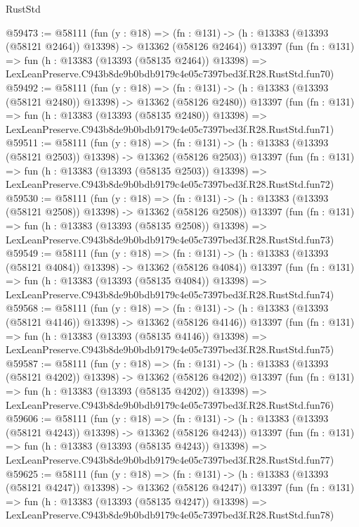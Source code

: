 \begin{lexlean}{RustStd}
\begin{coremodule}
@59473 := @58111
    (fun (y : @18) =>
    (fn : @131) -> (h : @13383 (@13393 (@58121 @2464)) @13398) -> @13362 (@58126 @2464))
    @13397
    (fun (fn : @131) =>
    fun (h : @13383 (@13393 (@58135 @2464)) @13398) =>
    LexLeanPreserve.C943b8de9b0bdb9179c4e05c7397bed3f.R28.RustStd.fun70)
@59492 := @58111
    (fun (y : @18) =>
    (fn : @131) -> (h : @13383 (@13393 (@58121 @2480)) @13398) -> @13362 (@58126 @2480))
    @13397
    (fun (fn : @131) =>
    fun (h : @13383 (@13393 (@58135 @2480)) @13398) =>
    LexLeanPreserve.C943b8de9b0bdb9179c4e05c7397bed3f.R28.RustStd.fun71)
@59511 := @58111
    (fun (y : @18) =>
    (fn : @131) -> (h : @13383 (@13393 (@58121 @2503)) @13398) -> @13362 (@58126 @2503))
    @13397
    (fun (fn : @131) =>
    fun (h : @13383 (@13393 (@58135 @2503)) @13398) =>
    LexLeanPreserve.C943b8de9b0bdb9179c4e05c7397bed3f.R28.RustStd.fun72)
@59530 := @58111
    (fun (y : @18) =>
    (fn : @131) -> (h : @13383 (@13393 (@58121 @2508)) @13398) -> @13362 (@58126 @2508))
    @13397
    (fun (fn : @131) =>
    fun (h : @13383 (@13393 (@58135 @2508)) @13398) =>
    LexLeanPreserve.C943b8de9b0bdb9179c4e05c7397bed3f.R28.RustStd.fun73)
@59549 := @58111
    (fun (y : @18) =>
    (fn : @131) -> (h : @13383 (@13393 (@58121 @4084)) @13398) -> @13362 (@58126 @4084))
    @13397
    (fun (fn : @131) =>
    fun (h : @13383 (@13393 (@58135 @4084)) @13398) =>
    LexLeanPreserve.C943b8de9b0bdb9179c4e05c7397bed3f.R28.RustStd.fun74)
@59568 := @58111
    (fun (y : @18) =>
    (fn : @131) -> (h : @13383 (@13393 (@58121 @4146)) @13398) -> @13362 (@58126 @4146))
    @13397
    (fun (fn : @131) =>
    fun (h : @13383 (@13393 (@58135 @4146)) @13398) =>
    LexLeanPreserve.C943b8de9b0bdb9179c4e05c7397bed3f.R28.RustStd.fun75)
@59587 := @58111
    (fun (y : @18) =>
    (fn : @131) -> (h : @13383 (@13393 (@58121 @4202)) @13398) -> @13362 (@58126 @4202))
    @13397
    (fun (fn : @131) =>
    fun (h : @13383 (@13393 (@58135 @4202)) @13398) =>
    LexLeanPreserve.C943b8de9b0bdb9179c4e05c7397bed3f.R28.RustStd.fun76)
@59606 := @58111
    (fun (y : @18) =>
    (fn : @131) -> (h : @13383 (@13393 (@58121 @4243)) @13398) -> @13362 (@58126 @4243))
    @13397
    (fun (fn : @131) =>
    fun (h : @13383 (@13393 (@58135 @4243)) @13398) =>
    LexLeanPreserve.C943b8de9b0bdb9179c4e05c7397bed3f.R28.RustStd.fun77)
@59625 := @58111
    (fun (y : @18) =>
    (fn : @131) -> (h : @13383 (@13393 (@58121 @4247)) @13398) -> @13362 (@58126 @4247))
    @13397
    (fun (fn : @131) =>
    fun (h : @13383 (@13393 (@58135 @4247)) @13398) =>
    LexLeanPreserve.C943b8de9b0bdb9179c4e05c7397bed3f.R28.RustStd.fun78)

\end{coremodule}
\end{lexlean}
